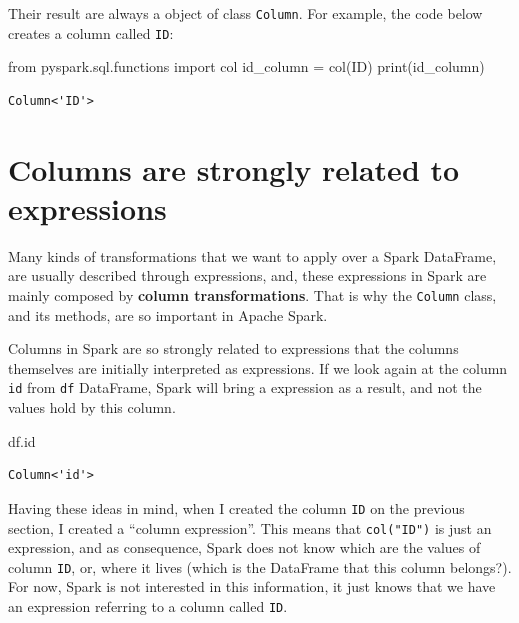\documentclass[
  11pt,
  letterpaper,
  DIV=11,
  numbers=noendperiod]{scrreprt}
\newenvironment{Shaded}{\begin{snugshade}}{\end{snugshade}}
\newcommand{\BuiltInTok}[1]{\textcolor[rgb]{0.00,0.23,0.31}{#1}}
\newcommand{\ImportTok}[1]{\textcolor[rgb]{0.00,0.46,0.62}{#1}}
\newcommand{\NormalTok}[1]{\textcolor[rgb]{0.00,0.23,0.31}{#1}}
\newcommand{\OperatorTok}[1]{\textcolor[rgb]{0.37,0.37,0.37}{#1}}
\newcommand{\StringTok}[1]{\textcolor[rgb]{0.13,0.47,0.30}{#1}}
\begin{document}
Their result are always a object of class \texttt{Column}. For example,
the code below creates a column called \texttt{ID}:

\begin{Shaded}
\begin{Highlighting}[]
\ImportTok{from}\NormalTok{ pyspark.sql.functions }\ImportTok{import}\NormalTok{ col}
\NormalTok{id\_column }\OperatorTok{=}\NormalTok{ col(}\StringTok{\textquotesingle{}ID\textquotesingle{}}\NormalTok{)}
\BuiltInTok{print}\NormalTok{(id\_column)}
\end{Highlighting}
\end{Shaded}

\begin{verbatim}
Column<'ID'>
\end{verbatim}

\hypertarget{sec-columns-related-expressions}{%
\section{Columns are strongly related to
expressions}\label{sec-columns-related-expressions}}

Many kinds of transformations that we want to apply over a Spark
DataFrame, are usually described through expressions, and, these
expressions in Spark are mainly composed by \textbf{column
transformations}. That is why the \texttt{Column} class, and its
methods, are so important in Apache Spark.

Columns in Spark are so strongly related to expressions that the columns
themselves are initially interpreted as expressions. If we look again at
the column \texttt{id} from \texttt{df} DataFrame, Spark will bring a
expression as a result, and not the values hold by this column.

\begin{Shaded}
\begin{Highlighting}[]
\NormalTok{df.}\BuiltInTok{id}
\end{Highlighting}
\end{Shaded}

\begin{verbatim}
Column<'id'>
\end{verbatim}

Having these ideas in mind, when I created the column \texttt{ID} on the
previous section, I created a ``column expression''. This means that
\texttt{col("ID")} is just an expression, and as consequence, Spark does
not know which are the values of column \texttt{ID}, or, where it lives
(which is the DataFrame that this column belongs?). For now, Spark is
not interested in this information, it just knows that we have an
expression referring to a column called \texttt{ID}.
\end{document}
